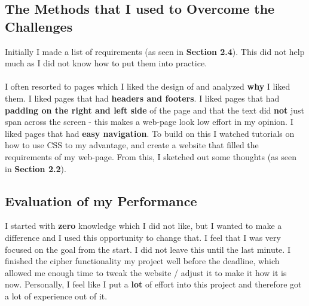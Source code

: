 \documentclass[10pt, a4paper]{article}
\begin{document}
    \subsection{The Methods that I used to Overcome the Challenges} Initially I made a list of requirements (as seen in \textbf{Section 2.4}). This did not help much as I did not know how to put them into practice. \\\\I often resorted to pages which I liked the design of and analyzed \textbf{why} I liked them. I liked pages that had \textbf{headers and footers}. I liked pages that had \textbf{padding on the right and left side} of the page and that the text did \textbf{not} just span across the screen - this makes a web-page look low effort in my opinion. I liked pages that had \textbf{easy navigation}. To build on this I watched tutorials on how to use CSS to my advantage, and create a website that filled the requirements of my web-page. From this, I sketched out some thoughts (as seen in \textbf{Section 2.2}).
    \subsection{Evaluation of my Performance}  I started with \textbf{zero} knowledge which I did not like, but I wanted to make a difference and I used this opportunity to change that. I feel that I was very focused on the goal from the start. I did not leave this until the last minute. I finished the cipher functionality my project well before the deadline, which allowed me enough time to tweak the website / adjust it to make it how it is now. Personally, I feel like I put a \textbf{lot} of effort into this project and therefore got a lot of experience out of it.



%    
    
\end{document}
